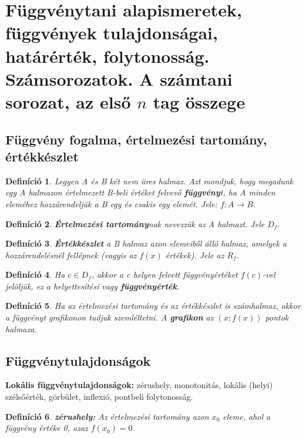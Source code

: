 \documentclass[12pt,a4paper]{article}
\newtheorem{definition}{Definíció} [section]
\begin{document}
\section{Függvénytani alapismeretek, függvények tulajdonságai, határérték, folytonosság. Számsorozatok. A számtani sorozat, az első $n$ tag összege}
\subsection{Függvény fogalma, értelmezési tartomány, értékkészlet}

\begin{definition}
Legyen A és B két nem üres halmaz. Azt mondjuk, hogy megadunk egy A halmazon értelmezett B-beli értéket felvevő \textbf{függvény}t, ha A minden eleméhez hozzárendeljük a B egy és csakis egy elemét. Jele: $f: A \rightarrow B$.
\end{definition}

\begin{definition}
\textbf{Értelmezési tartomány}nak nevezzük az A halmazt. Jele $D_f$.
\end{definition}

\begin{definition}
\textbf{Értékkészlet} a B halmaz azon elemeiből álló halmaz, amelyek a hozzárendelésnél fellépnek (vagyis az $f(x)$ értékek). Jele az $R_f$.
\end{definition}

\begin{definition}
Ha $c \in D_f$, akkor a c helyen felvett függvényértéket $f(c)$-vel jelöljük, ez a helyettesítési vagy \textbf{függvényérték}.
\end{definition}

\begin{definition}
Ha az értelmezési tartomány és az értékkészlet is számhalmaz, akkor a függvényt grafikonon tudjuk szemléltetni. A \textbf{grafikon} az $(x; f(x))$ pontok halmaza.
\end{definition}

\subsection{Függvénytulajdonságok}

\textbf{Lokális függvénytulajdonságok:} zérushely, monotonitás, lokális (helyi) szélsőérték, görbület,
inflexió, pontbeli folytonosság.

\begin{definition}
\textbf{zérushely:} Az értelmezési tartomány azon $x_0$ eleme, ahol a függvény értéke 0, azaz $f(x_0) = 0$.
\end{definition}
\end{document}
